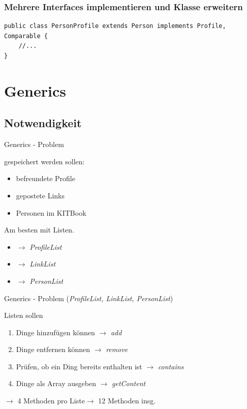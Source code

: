\documentclass[18pt]{beamer}
\begin{document}

\begin{frame}[containsverbatim]
	\frametitle{Mehrere Interfaces implementieren und Klasse erweitern}
	\begin{lstlisting}
public class PersonProfile extends Person implements Profile, Comparable {
	//...
}
	\end{lstlisting}
\end{frame}

\section{Generics}
\subsection*{Notwendigkeit}
\begin{frame}{Generics - Problem}

	gespeichert werden sollen:
	\begin{itemize}
		\item befreundete Profile
		\item gepostete Links
		\item Personen im KITBook
	\end{itemize}
	
	Am besten mit Listen.\pause
	
	\begin{itemize}
		\item $\rightarrow$ \emph{ProfileList}
		\item $\rightarrow$ \emph{LinkList}
		\item $\rightarrow$ \emph{PersonList}
	\end{itemize}
\end{frame}


\begin{frame}{Generics - Problem}
	(\emph{ProfileList, LinkList, PersonList})
	
	Listen sollen
	\begin{enumerate}
		\item Dinge hinzufügen können $\rightarrow$ \emph{add}
		\item Dinge entfernen können $\rightarrow$ \emph{remove} \pause
		\item Prüfen, ob ein Ding bereits enthalten ist $\rightarrow$ \emph{contains}
		\item Dinge als Array ausgeben $\rightarrow$ \emph{getContent}
	\end{enumerate}\pause
	
	$\rightarrow$ 4 Methoden pro Liste\pause $\rightarrow$ 12 Methoden insg.
\end{frame}
\end{document}
